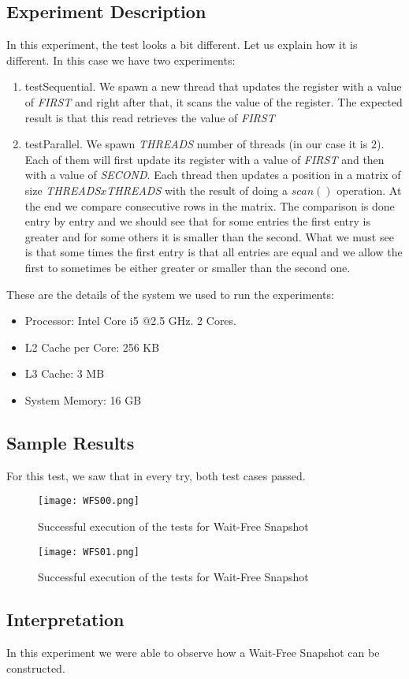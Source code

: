 \subsection{Experiment Description}
\par
In this experiment, the test looks a bit different. Let us explain how it is
different. In this case we have two experiments:
\par
\begin{enumerate}
\item testSequential. We spawn a new thread that updates the register with a
value of \textit{FIRST} and right after that, it scans the value of the
register. The expected result is that this read retrieves the value of
\textit{FIRST}
\item testParallel. We spawn \textit{THREADS} number of threads (in our case it
is $2$). Each of them will first update its register with a value of
\textit{FIRST} and then with a value of \textit{SECOND}. Each thread then
updates a position in a matrix of size \textit{THREADS}$x$\textit{THREADS} with
the result of doing a $scan()$ operation. At the end we compare consecutive rows
in the matrix. The comparison is done entry by entry and we should see that for
some entries the first entry is greater and for some others it is smaller than
the second. What we must see is that some times the first entry is that all
entries are equal and we allow the first to sometimes be either greater or
smaller than the second one.
\end{enumerate}
\par
These are the details of the system we used to run the experiments:
\begin{itemize}
\item Processor: Intel Core i5 @2.5 GHz. 2 Cores.
\item L2 Cache per Core: 256 KB
\item L3 Cache: 3 MB
\item System Memory: 16 GB
\end{itemize}
\subsection{Sample Results}
\par
For this test, we saw that in every try, both test cases passed.
\par
\begin{figure}[h]
  \centering
  \texttt{[image: WFS00.png]}
  \caption{Successful execution of the tests for Wait-Free Snapshot}
  \label{fig:WFS00}
\end{figure}
\par
\begin{figure}[h]
  \centering
  \texttt{[image: WFS01.png]}
  \caption{Successful execution of the tests for Wait-Free Snapshot}
  \label{fig:WFS01}
\end{figure}
\par
\subsection{Interpretation}
In this experiment we were able to observe how a Wait-Free Snapshot can be
constructed. 
